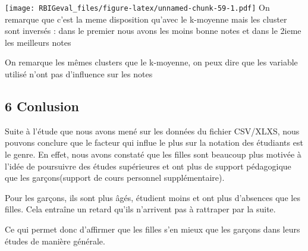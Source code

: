\documentclass[
]{article}
\begin{document}
\texttt{[image: RBIGeval\_files/figure-latex/unnamed-chunk-59-1.pdf]} On
remarque que c'est la meme disposition qu'avec le k-moyenne mais les
cluster sont inversés : dans le premier nous avons les moins bonne notes
et dans le 2ieme les meilleurs notes

On remarque les mêmes clusters que le k-moyenne, on peux dire que les
variable utilisé n'ont pas d'influence sur les notes

\hypertarget{conlusion}{%
\subsection{6 Conlusion}\label{conlusion}}

Suite à l'étude que nous avons mené sur les données du fichier CSV/XLXS,
nous pouvons conclure que le facteur qui influe le plus sur la notation
des étudiants est le genre. En effet, nous avons constaté que les filles
sont beaucoup plus motivée à l'idée de poursuivre des études supérieures
et ont plus de support pédagogique que les garçons(support de cours
personnel supplémentaire).

Pour les garçons, ils sont plus âgés, étudient moins et ont plus
d'absences que les filles. Cela entraîne un retard qu'ils n'arrivent pas
à rattraper par la suite.

Ce qui permet donc d'affirmer que les filles s'en mieux que les garçons
dans leurs études de manière générale.
\end{document}
